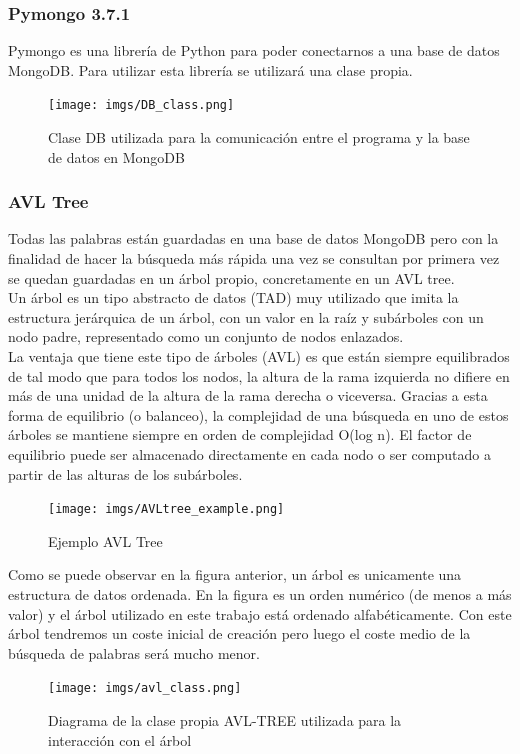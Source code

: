 \documentclass[../all.tex]{subfiles}
\begin{document}
    \subsubsection{Pymongo 3.7.1}
        Pymongo es una librería de Python para poder conectarnos a una base de datos MongoDB.
        Para utilizar esta librería se utilizará una clase propia.
        \begin{figure}[H]
        	\centering
        	\texttt{[image: imgs/DB\_class.png]}
        	\caption{Clase DB utilizada para la comunicación entre el programa y la base de datos en MongoDB}
        \end{figure}
        
    \subsubsection{AVL Tree}
        
    	Todas las palabras están guardadas en una base de datos MongoDB pero con la finalidad de hacer la búsqueda más rápida una vez se consultan por primera vez se quedan guardadas en un árbol propio, concretamente en un AVL tree. \\
    	
    	Un árbol es un tipo abstracto de datos (TAD) muy utilizado que imita la estructura jerárquica de un árbol, con un valor en la raíz y subárboles con un nodo padre, representado como un conjunto de nodos enlazados.\\
   
    	La ventaja que tiene este tipo de árboles (AVL) es que están siempre equilibrados de tal modo que para todos los nodos, la altura de la rama izquierda no difiere en más de una unidad de la altura de la rama derecha o viceversa. Gracias a esta forma de equilibrio (o balanceo), la complejidad de una búsqueda en uno de estos árboles se mantiene siempre en orden de complejidad O(log n). El factor de equilibrio puede ser almacenado directamente en cada nodo o ser computado a partir de las alturas de los subárboles.\\
    	
    	\begin{figure}[H]
    		\centering
    		\texttt{[image: imgs/AVLtree\_example.png]}
    		\caption{Ejemplo AVL Tree}
    	\end{figure}
    	
    	Como se puede observar en la figura anterior, un árbol es unicamente una estructura de datos ordenada. En la figura es un orden numérico (de menos a más valor)  y el árbol utilizado en este trabajo está ordenado alfabéticamente. Con este árbol tendremos un coste inicial de creación pero luego el coste medio de la búsqueda de palabras será mucho menor.
    	\begin{figure}[H]
    		\centering
    		\texttt{[image: imgs/avl\_class.png]}
    		\caption{Diagrama de la clase propia AVL-TREE utilizada para la interacción con el árbol}
    	\end{figure}
    
\end{document}
